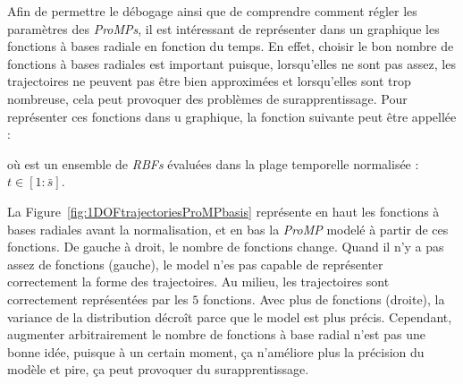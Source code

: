 \documentclass[utf8]{frontiersSCNS} %
\newcommand{\rev}[1]{\textcolor{blue}{#1}}
\newcommand{\todo}[1]{\textcolor{red}{\textbf{/*#1*/}}}
\begin{document}

Afin de permettre le débogage ainsi que de comprendre comment régler les paramètres des \textit{ProMPs}, il est intéressant de représenter dans un graphique les fonctions à bases radiale en fonction du temps. En effet, choisir le bon nombre de fonctions à bases radiales est important puisque, lorsqu'elles ne sont pas assez, les trajectoires ne peuvent pas être bien approximées et lorsqu'elles sont trop nombreuse, cela peut provoquer des problèmes de surapprentissage. Pour représenter ces fonctions dans u graphique, la fonction suivante peut être appellée : 


où  est un ensemble de \textit{RBFs} évaluées dans la plage temporelle normalisée : $t \in [1:\bar{s}]$.

La Figure~\ref{fig:1DOFtrajectoriesProMPbasis} représente en haut les fonctions à bases radiales avant la normalisation, et en bas la \textit{ProMP} modelé à partir de ces fonctions. De gauche à droit, le nombre de fonctions change. Quand il n'y a pas assez de fonctions (gauche), le model n'es pas capable de représenter correctement la forme des trajectoires. Au milieu, les trajectoires sont correctement représentées par les $5$ fonctions. Avec plus de fonctions (droite), la variance de la distribution décroît parce que le model est plus précis. 
Cependant, augmenter arbitrairement le nombre de fonctions à base radial n'est pas une bonne idée, puisque à un certain moment, ça n'améliore plus la précision du modèle et pire, ça peut provoquer du surapprentissage.
\end{document}
